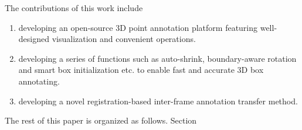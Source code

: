 \documentclass[letterpaper, 10 pt, conference]{ieeeconf}  %
\begin{document}
The contributions of this work include
\begin{enumerate}

	\item developing an open-source 3D point annotation platform featuring  well-designed visualization and convenient operations.
	\item developing a series of functions such as auto-shrink, boundary-aware rotation and smart box initialization etc. to enable fast and accurate 3D box annotating.
	\item developing a novel registration-based inter-frame annotation transfer method.
\end{enumerate}

The rest of this paper is organized as follows. Section
\end{document}
